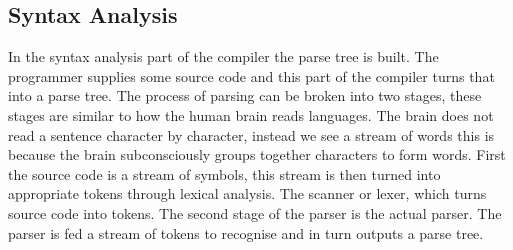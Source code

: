\subsection{Syntax Analysis}\label{sec:syntaxAnalysis}
In the syntax analysis part of the compiler the parse tree is built.
The programmer supplies some source code and this part of the compiler turns that into a parse tree.
The process of parsing can be broken into two stages, these stages are similar to how the human brain reads languages.
The brain does not read a sentence character by character, instead we see a stream of words this is because the brain subconsciously groups together characters to form words.
First the source code is a stream of symbols, this stream is then turned into appropriate tokens through lexical analysis.
The scanner or lexer, which turns source code into tokens.
The second stage of the parser is the actual parser.
The parser is fed a stream of tokens to recognise and in turn outputs a parse tree.

